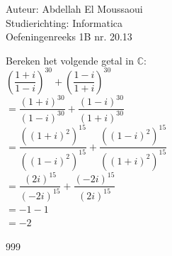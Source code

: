 \documentclass[a4paper]{article}
\begin{document}
  
\noindent \large Auteur: Abdellah El Moussaoui \\
\noindent \large Studierichting: Informatica\\
\noindent \large Oefeningenreeks 1B nr. 20.13\\

\medskip

\normalsize

\medskip

Bereken het volgende getal in $\mathbb{C}$: \\

$\left(\dfrac{1+i}{1-i}\right)^{30}+\left(\dfrac{1 - i}{1 + i}\right)^{30}$\\

$=\dfrac{(1 + i)^{30}}{(1- i)^{30}}+\dfrac{(1 -i)^{30}}{(1+i)^{30}}$\\

$=\dfrac{\left((1+i)^2\right)^{15}}{\left((1-i)^2\right)^{15}}+\dfrac{\left((1-i)^2\right)^{15}}{\left((1+i)^2\right)^{15}}$\\

$=\dfrac{(2i)^{15}}{(-2i)^{15}}+\dfrac{(-2i)^{15}}{(2i)^{15}}$\\


$=-1-1$\\

$=-2$\\

\begin{thebibliography}{999}
\end{thebibliography}
\end{document}
